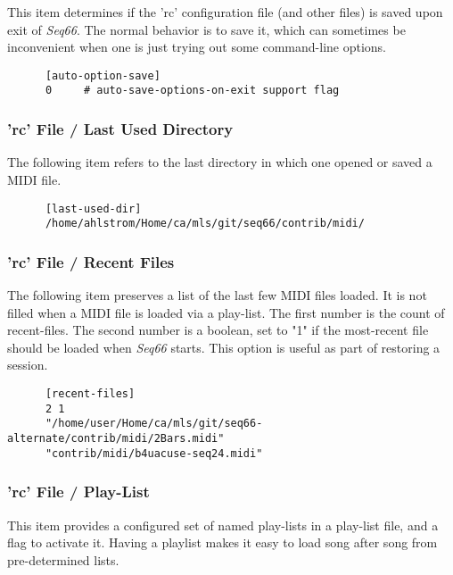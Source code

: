    This item determines if the 'rc' configuration file (and other files)
   is saved upon exit of \textsl{Seq66}.
   The normal behavior is to save it,
   which can sometimes be inconvenient when one is just trying out some
   command-line options.

   \begin{verbatim}
      [auto-option-save]
      0     # auto-save-options-on-exit support flag
   \end{verbatim}

\subsubsection{'rc' File / Last Used Directory}
\label{subsubsec:configuration_rc_last_used_dir}

   The following item refers to the last directory in which one opened or
   saved a MIDI file.

   \begin{verbatim}
      [last-used-dir]
      /home/ahlstrom/Home/ca/mls/git/seq66/contrib/midi/
   \end{verbatim}

\subsubsection{'rc' File / Recent Files}
\label{subsubsec:configuration_rc_recent_files}

   The following item preserves a list of the last few MIDI files loaded.
   It is not filled when a MIDI file is loaded via a play-list.
   The first number is the count of recent-files.
   The second number is a boolean, set to "1" if the most-recent file
   should be loaded when \textsl{Seq66} starts.
   This option is useful as part of restoring a session.

   \begin{verbatim}
      [recent-files]
      2 1
      "/home/user/Home/ca/mls/git/seq66-alternate/contrib/midi/2Bars.midi"
      "contrib/midi/b4uacuse-seq24.midi"
   \end{verbatim}

\subsubsection{'rc' File / Play-List}
\label{subsubsec:configuration_rc_playlist}

   This item provides a configured set of named play-lists in a play-list file,
   and a flag to activate it.
   Having a playlist makes it easy to load song after song from pre-determined
   lists.
   
